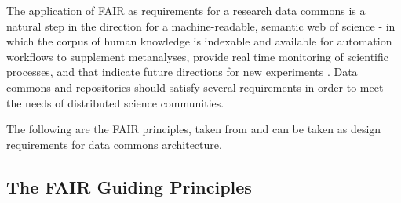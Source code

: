 \documentclass[conference]{IEEEtran}
\begin{document}
The application of FAIR as requirements for a research data commons is a natural step in the direction for a machine-readable, semantic web of science - in which the corpus of human knowledge is indexable and available for automation workflows to supplement metanalyses, provide real time monitoring of scientific processes, and that indicate future directions for new experiments \cite{Wilkinson2016}. Data commons and repositories should satisfy several requirements in order to meet the needs of distributed science communities.

The following are the FAIR principles, taken from \cite{Wilkinson2016} and can be taken as design requirements for data commons architecture.

\subsection{The FAIR Guiding Principles}
\end{document}
